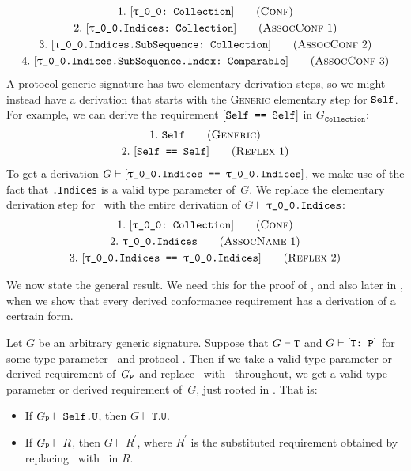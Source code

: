 \documentclass[../generics]{subfiles}
\begin{document}
\begin{gather*}
\ConfStep{\rT}{Collection}{1}\\
\AssocConfStep{1}{\rT.Indices}{Collection}{2}\\
\AssocConfStep{2}{\rT.Indices.SubSequence}{Collection}{3}\\
\AssocConfStep{3}{\rT.Indices.SubSequence.Index}{Comparable}{4}
\end{gather*}
A protocol generic signature has two elementary derivation steps, so we might instead have a derivation that starts with the \textsc{Generic} elementary step for $\texttt{Self}$. For example, we can derive the requirement $[\texttt{Self == Self}]$ in $G_\texttt{Collection}$:
\begin{gather*}
\GenericStep{Self}{1}\\
\ReflexStep{1}{Self}{2}
\end{gather*}
To get a derivation $G \vdash \SameReq{\rT.Indices}{\rT.Indices}$, we make use of the fact that \texttt{\rT.Indices} is a valid type parameter of~$G$. We replace the elementary derivation step for \tSelf\ with the entire derivation of $G \vdash \texttt{\rT.Indices}$:
\begin{gather*}
\ConfStep{\rT}{Collection}{1}\\
\AssocNameStep{1}{\rT.Indices}{2}\\
\ReflexStep{2}{\rT.Indices}{3}
\end{gather*}

We now state the general result. We need this for the proof of , and also later in , when we show that every derived conformance requirement has a derivation of a certrain form.

\begin{lemma}\label{subst lemma}
Let $G$ be an arbitrary generic signature. Suppose that $G\vdash\texttt{T}$ and $G\vdash[\texttt{T:~P}]$ for some type parameter \tT\ and protocol \tP. Then if we take a valid type parameter or derived requirement of~$G_{\texttt{P}}$ and replace \tSelf\ with \tT\ throughout, we get a valid type parameter or derived requirement of~$G$, just rooted in \tT. That is:
\begin{itemize}
\item If $G_{\texttt{P}}\vdash\texttt{Self.U}$, then $G\vdash\texttt{T.U}$.
\item If $G_{\texttt{P}}\vdash R$, then $G\vdash R^\prime$, where $R^\prime$ is the substituted requirement obtained by replacing \tSelf\ with \tT\ in $R$.
\end{itemize}
\end{lemma}
\end{document}
